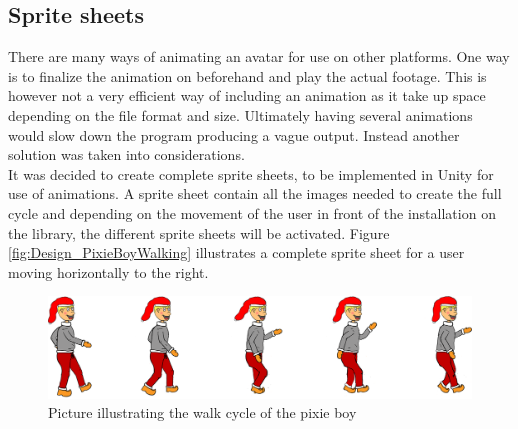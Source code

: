 \subsection{Sprite sheets}\label{spritesheet}
There are many ways of animating an avatar for use on other platforms. One way is to finalize the animation on beforehand and play the actual footage. This is however not a very efficient way of including an animation as it take up space depending on the file format and size. Ultimately having several animations would slow down the program producing a vague output. Instead another solution was taken into considerations.\\
It was decided to create complete sprite sheets, to be implemented in Unity for use of animations. A sprite sheet contain all the images needed to create the full cycle and depending on the movement of the user in front of the installation on the library, the different sprite sheets will be activated. Figure \eqref{fig:Design_PixieBoyWalking} illustrates a complete sprite sheet for a user moving horizontally to the right.
\begin{figure}[htbp]
\centering
\includegraphics[width=1.00\textwidth]{Pictures/Design/PixieWalking.png}
\caption{Picture illustrating the walk cycle of the pixie boy}
\label{fig:Design_PixieBoyWalking}
\end{figure}